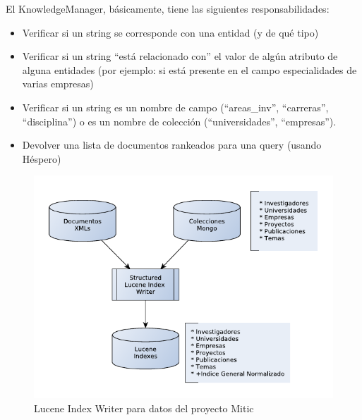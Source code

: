 \bigskip

El KnowledgeManager, b\'asicamente, tiene las siguientes
responsabilidades:

\begin{itemize}
\item Verificar si un string se corresponde con una entidad (y de qu\'e
tipo)
\item Verificar si un string {\textquotedblleft}est\'a relacionado
con{\textquotedblright} el valor de alg\'un atributo de alguna
entidades (por ejemplo: si est\'a presente en el campo especialidades
de varias empresas)
\item Verificar si un string es un nombre de campo
({\textquotedblleft}areas\_inv{\textquotedblright},
{\textquotedblleft}carreras{\textquotedblright},
{\textquotedblleft}disciplina{\textquotedblright}) o es un nombre de
colecci\'on ({\textquotedblleft}universidades{\textquotedblright},
{\textquotedblleft}empresas{\textquotedblright}).
\item Devolver una lista de documentos rankeados para una query (usando
H\'espero)
\end{itemize}

%
%
%
%
%
%
%
%
%

\begin{figure}
  \centering
    \includegraphics{graficos/LuceneIndexWriterEstructurado}
  \caption{Lucene Index Writer para datos del proyecto Mitic}
  \label{fig:LuceneIndexWriterEstructurado}
\end{figure}

